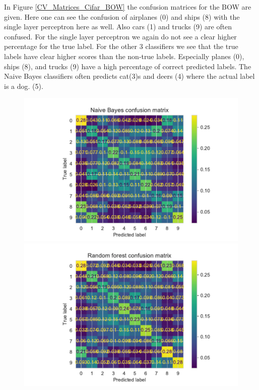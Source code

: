 \documentclass[11pt]{article}
\begin{document}
In Figure \ref{CV_Matrices_Cifar_BOW} the confusion matrices for the BOW are given. Here one can see the confusion of airplanes (0) and ships (8)  with the single layer perceptron here as well. Also cars (1) and trucks (9) are often confused. For the single layer perceptron we again do not see a clear higher percentage for the true label. For the other 3 classifiers we see that the true labels have clear higher scores than the non-true labels. Especially planes (0), ships (8), and trucks (9) have a high percentage of correct predicted labels. The Naive Bayes classifiers often predicts cat(3)s and deers (4) where the actual label is a dog. (5).  

\begin{figure}[H]
\begin{minipage}[c]{0.5\textwidth}
\includegraphics[width=1\linewidth]{figures/Cifar/CM__NB_color_hist.pdf}
\end{minipage}
\begin{minipage}[c]{0.5\textwidth}
\includegraphics[width=1\linewidth]{figures/Cifar/CM__Rndf_color_hist.pdf}

\end{minipage}
\end{figure}
\end{document}
